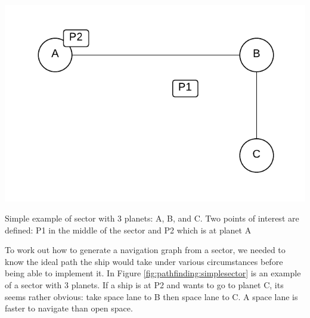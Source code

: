 \begin{marginfigure}
	\includegraphics{res/pathfinding/PathFindingSector.pdf}
	\caption[Simple example of sector]{Simple example of sector with 3 planets: A, B, and C. Two points of interest are defined: P1 in the middle of the sector and P2 which is at planet A}
	\label{fig:pathfinding:simplesector}
\end{marginfigure}

To work out how to generate a navigation graph from a sector, we needed to know the ideal path the ship would take under various circumstances before being able to implement it.
In Figure \ref{fig:pathfinding:simplesector} is an example of a sector with 3 planets.
If a ship is at P2 and wants to go to planet C, its seems rather obvious: take space lane to B then space lane to C. A space lane is faster to navigate than open space.

